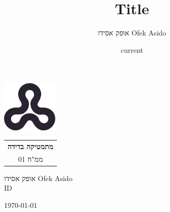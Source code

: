 \documentclass[a4paper,12pt]{report}
\title{Title}
\author{אופק אסידו \textenglish{Ofek Asido}}
\date{current}
\begin{document}
\begin{titlepage}
	\centering
	\vspace*{2em}

	\includegraphics[width=0.2\textwidth]{assets/ou_logo}

	\vspace{2cm}

	\begin{tabular}{c}
		{\Huge\textbf{מתמטיקה בדידה}} \\
		{\LARGE ממ"ח 01}
	\end{tabular}

	\vspace{2cm}

	{\Large אופק אסידו \textenglish{Ofek Asido}\\ID}

	\vspace{10cm}

	{\large \hebrewfont
		\today
	}

	\vspace*{2em}
\end{titlepage}
\end{document}
